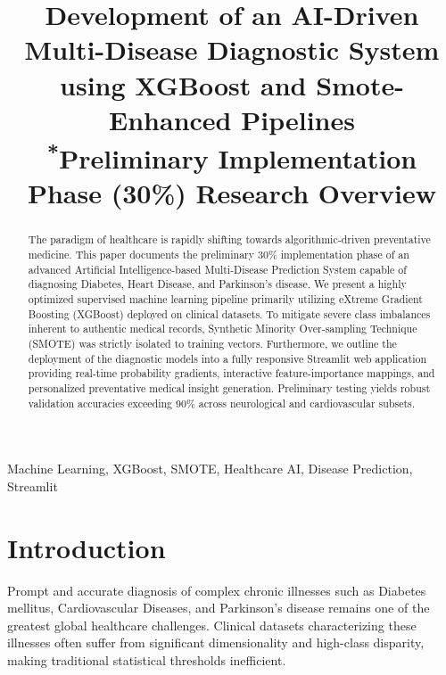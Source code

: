 \documentclass[conference]{IEEEtran}
\begin{document}
\title{Development of an AI-Driven Multi-Disease Diagnostic System using XGBoost and Smote-Enhanced Pipelines\\
{\footnotesize \textsuperscript{*}Preliminary Implementation Phase (30\%) Research Overview}
}

\author{
}

\maketitle

\begin{abstract}
The paradigm of healthcare is rapidly shifting towards algorithmic-driven preventative medicine. This paper documents the preliminary 30\% implementation phase of an advanced Artificial Intelligence-based Multi-Disease Prediction System capable of diagnosing Diabetes, Heart Disease, and Parkinson's disease. We present a highly optimized supervised machine learning pipeline primarily utilizing eXtreme Gradient Boosting (XGBoost) deployed on clinical datasets. To mitigate severe class imbalances inherent to authentic medical records, Synthetic Minority Over-sampling Technique (SMOTE) was strictly isolated to training vectors. Furthermore, we outline the deployment of the diagnostic models into a fully responsive Streamlit web application providing real-time probability gradients, interactive feature-importance mappings, and personalized preventative medical insight generation. Preliminary testing yields robust validation accuracies exceeding 90\% across neurological and cardiovascular subsets.
\end{abstract}

\begin{IEEEkeywords}
Machine Learning, XGBoost, SMOTE, Healthcare AI, Disease Prediction, Streamlit
\end{IEEEkeywords}

\section{Introduction}
Prompt and accurate diagnosis of complex chronic illnesses such as Diabetes mellitus, Cardiovascular Diseases, and Parkinson's disease remains one of the greatest global healthcare challenges. Clinical datasets characterizing these illnesses often suffer from significant dimensionality and high-class disparity, making traditional statistical thresholds inefficient. 
\end{document}
